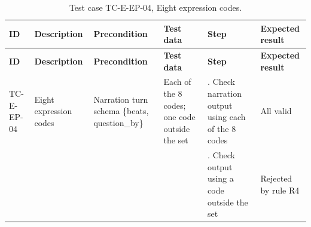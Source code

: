 {\footnotesize{}\renewcommand{\arraystretch}{1.1}
\begin{longtable}{|>{\raggedright\arraybackslash}p{}|>{\raggedright\arraybackslash}p{}|>{\raggedright\arraybackslash}p{}|>{\raggedright\arraybackslash}p{}|>{\raggedright\arraybackslash}p{}|>{\raggedright\arraybackslash}p{}|}
\caption{Test case TC-E-EP-04, Eight expression codes.} \\
\hline
\textbf{ID} & \textbf{Description} & \textbf{Precondition} & \textbf{Test data} & \textbf{Step} & \textbf{Expected result} \\ \hline
\endfirsthead
\hline
\textbf{ID} & \textbf{Description} & \textbf{Precondition} & \textbf{Test data} & \textbf{Step} & \textbf{Expected result} \\ \hline
\endhead
TC-E-EP-04 & Eight expression codes & Narration turn schema \{beats, question\_\allowbreak{}by\} & Each of the 8 codes; one code outside the set & 1. Check narration output using each of the 8 codes & All valid \\ \cline{5-6}
 &  &  &  & 2. Check output using a code outside the set & Rejected by rule R4 \\ \hline
\end{longtable}
}


